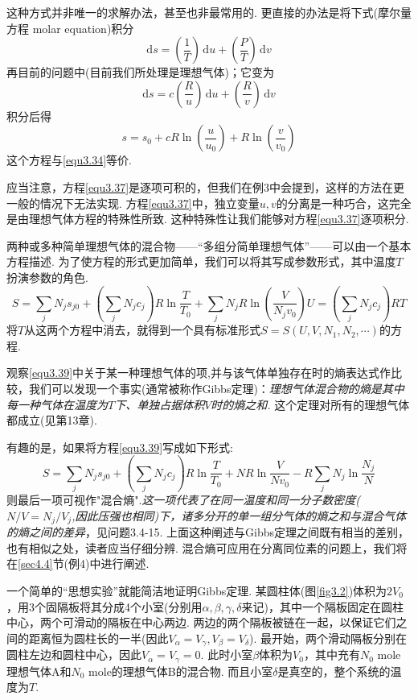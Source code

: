 这种方式并非唯一的求解办法，甚至也非最常用的. 更直接的办法是将下式(摩尔量方程 molar equation)积分
\begin{equation}
\label{equ3.36}
\text{d}s=\left(\frac{1}{T}\right)\,\text{d}u+\left(\frac{P}{T}\right)\,\text{d}v
\end{equation}
再目前的问题中(目前我们所处理是理想气体)；它变为
\begin{equation}
\label{equ3.37}
\text{d}s=c\left(\frac{R}{u}\right)\,\text{d}u+\left(\frac{R}{v}\right)\,\text{d}v
\end{equation}
积分后得
\begin{equation}
\label{equ3.38}
s=s_0+cR\ln(\frac{u}{u_0})+R\ln(\frac{v}{v_0})
\end{equation}
这个方程与\eqref{equ3.34}等价.

应当注意，方程\eqref{equ3.37}是逐项可积的，但我们在例3中会提到，这样的方法在更一般的情况下无法实现. 方程\eqref{equ3.37}中，独立变量$u,v$的分离是一种巧合，这完全是由理想气体方程的特殊性所致. 这种特殊性让我们能够对方程\eqref{equ3.37}逐项积分.

两种或多种简单理想气体的混合物——“多组分简单理想气体”——可以由一个基本方程描述. 为了使方程的形式更加简单，我们可以将其写成参数形式，其中温度$T$扮演参数的角色.
\begin{equation}
\label{equ3.39}
S=\sum_j N_js_{j0}+\left(\sum_j N_jc_j\right)R\ln\frac{T}{T_0}+\sum_j N_jR\ln\left(\frac{V}{N_jv_0}\right)
U=\left(\sum_jN_jc_j\right)RT
\end{equation}
将$T$从这两个方程中消去，就得到一个具有标准形式$S=S(U,V,N_1,N_2,\cdots)$的方程.

观察\eqref{equ3.39}中关于某一种理想气体的项,并与该气体单独存在时的熵表达式作比较，我们可以发现一个事实(通常被称作Gibbs定理)：{\it 理想气体混合物的熵是其中每一种气体在温度为$T$下、单独占据体积$V$时的熵之和. }这个定理对所有的理想气体都成立(见第13章).

有趣的是，如果将方程\eqref{equ3.39}写成如下形式:
\begin{equation}
\label{equ3.40}
S=\sum_jN_js_{j0}+\left(\sum_jN_jc_{j}\right)R\ln{\frac{T}{T_0}}+NR\ln{\frac{V}{Nv_0}}-R\sum_jN_j\ln{\frac{N_j}{N}}
\end{equation}
则最后一项可视作"混合熵".{\it 这一项代表了在同一温度和同一分子数密度($N/V=N_j/V_j$,因此压强也相同)下，诸多分开的单一组分气体的熵之和与混合气体的熵之间的差异}，见问题3.4-15. 上面这种阐述与Gibbs定理之间既有相当的差别，也有相似之处，读者应当仔细分辨. 混合熵可应用在分离同位素的问题上，我们将在\ref{sec4.4}节(例4)中进行阐述.

一个简单的“思想实验”就能简洁地证明Gibbs定理. 某圆柱体(图\ref{fig3.2})体积为$2V_0$，用3个固隔板将其分成4个小室(分别用$\alpha,\beta,\gamma,\delta$来记)，其中一个隔板固定在圆柱中心，两个可滑动的隔板在中心两边. 两边的两个隔板被链在一起，以保证它们之间的距离恒为圆柱长的一半(因此$V_\alpha=V_\gamma, V_\beta=V_\delta$). 最开始，两个滑动隔板分别在圆柱左边和圆柱中心，因此$V_\alpha=V_\gamma=0$. 此时小室$\beta$体积为$V_0$，其中充有$N_0$  mole理想气体A和$N_0$ mole的理想气体B的混合物. 而且小室$\delta$是真空的，整个系统的温度为$T$.


